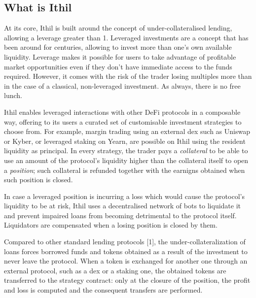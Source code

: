 \documentclass[a4paper,10 pt]{article}
\theoremstyle{definition}
\begin{document}
\subsection{What is Ithil}

At its core, Ithil is built around the concept of under-collateralised lending, allowing a leverage greater than 1.
Leveraged investments are a concept that has been around for centuries, allowing to invest more than one's own available liquidity. Leverage makes it possible for users to take advantage of profitable market opportunities even if they don't have immediate access to the funds required. However, it comes with the risk of the trader losing multiples more than in the case of a classical, non-leveraged investment. As always, there is no free lunch.

Ithil enables leveraged interactions with other DeFi protocols in a composable way, offering to its users a curated set of customisable investment strategies to choose from. For example, margin trading using an external dex such as Uniswap or Kyber, or leveraged staking on Yearn, are possible on Ithil using the resident liquidity as principal. In every strategy, the trader pays a {\it collateral} to be able to use an amount of the protocol's liquidity higher than the collateral itself to open a {\it position}; such collateral is refunded together with the earnigns obtained when such position is closed.

In case a leveraged position is incurring a loss which would cause the protocol's liquidity to be at risk, Ithil uses a decentralised network of bots to liquidate it and prevent impaired loans from becoming detrimental to the protocol itself. Liquidators are compensated when a losing position is closed by them.

Compared to other standard lending protocols [1], the under-collateralization of loans forces borrowed funds and tokens obtained as a result of the investment to never leave the protocol. When a token is exchanged for another one through an external protocol, such as a dex or a staking one, the obtained tokens are transferred to the strategy contract: only at the closure of the position, the profit and loss is computed and the consequent transfers are performed.
\end{document}
